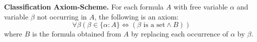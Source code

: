 \textbf{Classification Axiom-Scheme.} For each formula $A$ with free variable $\alpha$ and variable $\beta$ not occurring in $A$, the following is an axiom:
$$\forall \beta \left( \beta \in \{\alpha : A\} \iff (\beta \text{ is a set} \land B) \right)$$
where $B$ is the formula obtained from $A$ by replacing each occurrence of $\alpha$ by $\beta$.

